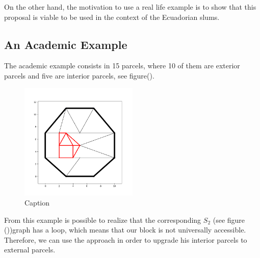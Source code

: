 \documentclass[10pt]{article}
\begin{document}
On the other hand, the motivation to use a real life example is to show that this proposal is viable to be used in the context of the Ecuadorian slums.

\subsection{An Academic Example}
The academic example consists in 15 parcels, where 10 of them are exterior parcels and five are interior parcels, see figure().\\

\begin{figure}[H]
    \centering
    \includegraphics[width=0.50\textwidth]{images/Figure_1.png}
    \caption{Caption}
    \label{fig:my_label}
\end{figure}

From this example is possible to realize that the corresponding $S_2$ (see figure ())graph has a loop, which means that our block is not universally accessible. Therefore, we can use the approach in order to upgrade his interior parcels to external parcels.\\
\end{document}
